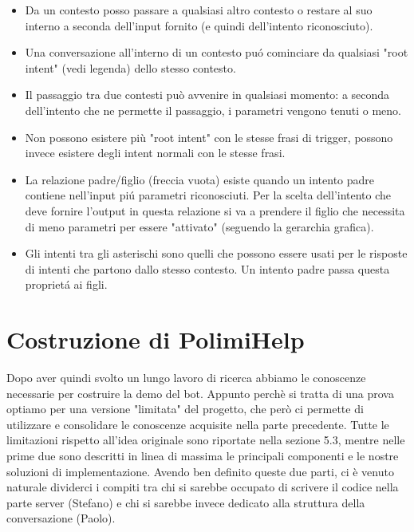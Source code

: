 \documentclass[]{article}
\begin{document}
\begin{itemize}
\item Da un contesto posso passare a qualsiasi altro contesto o restare al suo interno a seconda dell'input fornito (e quindi dell'intento riconosciuto).
\item Una conversazione all'interno di un contesto puó cominciare da qualsiasi "root intent" (vedi legenda) dello stesso contesto.
\item Il passaggio tra due contesti può avvenire in qualsiasi momento: a seconda dell'intento che ne permette il passaggio, i parametri vengono tenuti o meno. 
\item Non possono esistere più "root intent" con le stesse frasi di trigger, possono invece esistere degli intent normali con le stesse frasi.
\item La relazione padre/figlio (freccia vuota) esiste quando un intento padre contiene nell'input piú parametri riconosciuti. Per la scelta dell'intento che deve fornire l'output in questa relazione si va a prendere il figlio che necessita di meno parametri per essere "attivato" (seguendo la gerarchia grafica).
\item Gli intenti tra gli asterischi sono quelli che possono essere usati per le risposte di intenti che partono dallo stesso contesto. Un intento padre passa questa proprietá ai figli.


\end{itemize}





\section{Costruzione di PolimiHelp}
Dopo aver quindi svolto un lungo lavoro di ricerca abbiamo le conoscenze necessarie per costruire la demo del bot. Appunto perchè si tratta di una prova optiamo per una versione "limitata" del progetto, che però ci permette di utilizzare e consolidare le conoscenze acquisite nella parte precedente. Tutte le limitazioni rispetto all'idea originale sono riportate nella sezione 5.3, mentre nelle prime due sono descritti in linea di massima le principali componenti e le nostre soluzioni di implementazione. Avendo ben definito queste due parti, ci è venuto naturale dividerci i compiti tra chi si sarebbe occupato di scrivere il codice nella parte server (Stefano) e chi si sarebbe invece dedicato alla struttura della conversazione (Paolo).
\end{document}
